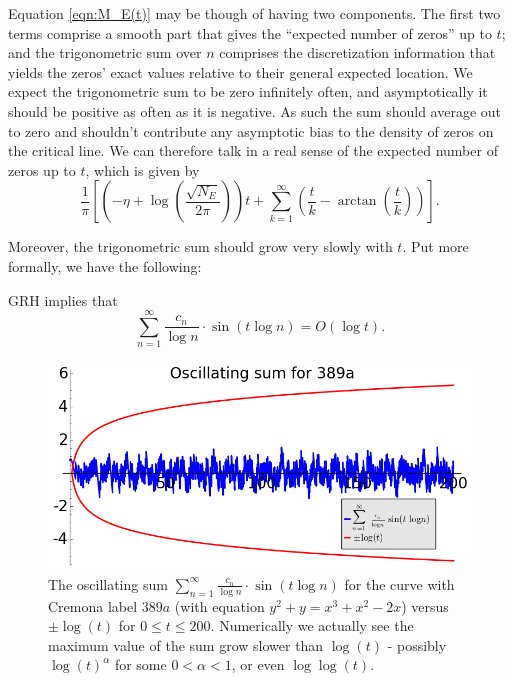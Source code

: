 Equation \ref{eqn:M_E(t)} may be though of having two components. The first two terms comprise a smooth part that gives the ``expected number of zeros'' up to $t$; and the trigonometric sum over $n$ comprises the discretization information that yields the zeros' exact values relative to their general expected location. We expect the trigonometric sum to be zero infinitely often, and asymptotically it should be positive as often as it is negative. As such the sum should average out to zero and shouldn't contribute any asymptotic bias to the density of zeros on the critical line. We can therefore talk in a real sense of the expected number of zeros up to $t$, which is given by
\begin{equation}\label{eqn:M_E_smooth_part}
\frac{1}{\pi}\left[\left(-\eta+\log\left(\frac{\sqrt{N_E}}{2\pi}\right)\right) t + \sum_{k=1}^{\infty} \left(\frac{t}{k} - \arctan\left(\frac{t}{k}\right)\right)\right].
\end{equation}

Moreover, the trigonometric sum should grow very slowly with $t$. Put more formally, we have the following:
\begin{conjecture}[GRH]\label{conj:trig_sum_size}
GRH implies that
\begin{equation}
\sum_{n=1}^{\infty} \frac{c_n}{\log n}\cdot \sin(t\log n) = O(\log t).
\end{equation}
\end{conjecture}

\begin{figure}[!h]
    \centering
    \includegraphics[width=1.0\textwidth]{graphics/M_E_trig_sum_bounds.png}
    \caption{The oscillating sum $\sum_{n=1}^{\infty} \frac{c_n}{\log n}\cdot \sin(t\log n)$ for the curve with Cremona label $389a$ (with equation $y^2 + y = x^3 + x^2 - 2x$) versus $\pm \log(t)$ for $0\le t \le 200$. Numerically we actually see the maximum value of the sum grow slower than $\log(t)$ - possibly $\log(t)^{\alpha}$ for some $0<\alpha<1$, or even $\log\log(t)$.}
    \label{fig:M_E_trig_sum_bounds}
\end{figure}

